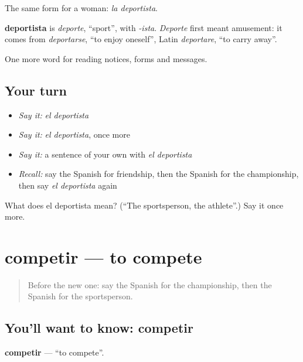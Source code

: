 The same form for a woman: \emph{la deportista}.

\begin{cousinweb}
\textbf{deportista} is \emph{deporte}, \textquotedblleft{}sport\textquotedblright{}, with \emph{-ista}. \emph{Deporte} first meant amusement: it comes from \emph{deportarse}, \textquotedblleft{}to enjoy oneself\textquotedblright{}, Latin \emph{deportare}, \textquotedblleft{}to carry away\textquotedblright{}.
\end{cousinweb}

\begin{grammarlens}[title={What you've built}]
One more word for reading notices, forms and messages.
\end{grammarlens}

\subsection*{Your turn}
\begin{itemize}
\raggedright
  \item \emph{Say it:} \emph{el deportista}
  \item \emph{Say it:} \emph{el deportista}, once more
  \item \emph{Say it:} a sentence of your own with \emph{el deportista}
  \item \emph{Recall:} say the Spanish for friendship, then the Spanish for the championship, then say \emph{el deportista} again
\end{itemize}

\begin{tcolorbox}[breakable,colback=teal!4,colframe=teal!35!black,title={Before you move on}]
What does el deportista mean? (\textquotedblleft{}The sportsperson, the athlete\textquotedblright{}.) Say it once more.
\end{tcolorbox}
\section[competir]{competir — to compete}

\label{lesson:ES-C498-competir}



\begin{quote}
Before the new one: say the Spanish for the championship, then the Spanish for the sportsperson.
\end{quote}

\subsection*{You'll want to know: competir}
\textbf{competir} — \textquotedblleft{}to compete\textquotedblright{}.


